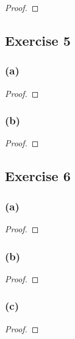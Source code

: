 \documentclass[14pt]{extarticle}
\begin{document}
\begin{proof}

\end{proof}

\subsection{Exercise 5}

\subsubsection{(a)}

\begin{proof}

\end{proof}

\subsubsection{(b)}

\begin{proof}

\end{proof}

\subsection{Exercise 6}

\subsubsection{(a)}

\begin{proof}

\end{proof}

\subsubsection{(b)}

\begin{proof}

\end{proof}

\subsubsection{(c)}

\begin{proof}

\end{proof}
\end{document}
